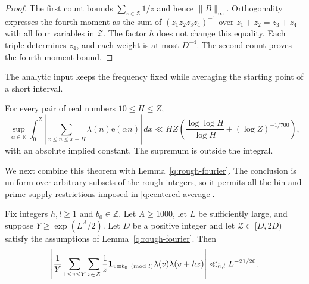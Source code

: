 \begin{proof}
The first count bounds $\sum_{z\in\mathcal Z}1/z$ and hence
$\|B\|_\infty$. Orthogonality expresses the fourth moment as the sum of
$(z_1z_2z_3z_4)^{-1}$ over
$z_1+z_2=z_3+z_4$ with all four variables in $\mathcal Z$.
The factor $h$ does not change this equality. Each triple determines $z_4$,
and each weight is at most $D^{-4}$. The second count proves the fourth
moment bound.
\end{proof}

The analytic input keeps the frequency fixed while averaging the starting
point of a short interval.

\begin{theorem}\label{q:MRT-short}
For every pair of real numbers $10\le H\le Z$,
\[
 \sup_{\alpha\in\mathbb R}
 \int_0^Z
 \left|\sum_{x\le n\le x+H}\lambda(n)\mathrm e(\alpha n)\right|\,dx
 \ll HZ\left(\frac{\log\log H}{\log H}
                  +(\log Z)^{-1/700}\right),
\]
with an absolute implied constant. The supremum is outside the integral.
\end{theorem}

We next combine this theorem with Lemma~\ref{q:rough-fourier}. The conclusion
is uniform over arbitrary subsets of the rough integers, so it permits all
the bin and prime-supply restrictions imposed in
\eqref{q:centered-average}.

\begin{lemma}\label{q:rough-shifts}
Fix integers $h,l\ge1$ and $b_0\in\mathbb Z$. Let $A\ge1000$, let $L$ be
sufficiently large, and suppose $Y\ge\exp(L^A/2)$. Let $D$ be a positive
integer and let $\mathcal Z\subset[D,2D)$ satisfy the assumptions of
Lemma~\ref{q:rough-fourier}. Then
\begin{equation}\label{q:rough-correlation}
 \left|\frac1Y\sum_{1\le v\le Y}
       \sum_{z\in\mathcal Z}\frac1z
       \mathbf 1_{v\equiv b_0\pmod l}\lambda(v)\lambda(v+hz)\right|
 \ll_{h,l}L^{-21/20}.
\end{equation}
\end{lemma}

